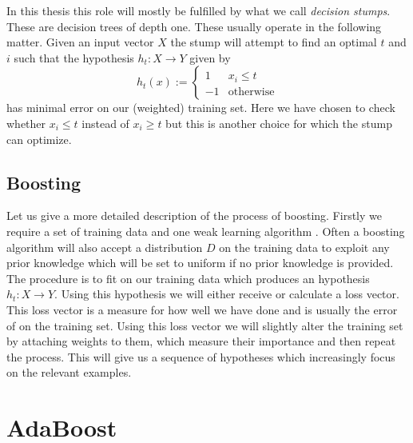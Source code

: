 \par In this thesis this role will mostly be fulfilled by what we call \textit{decision stumps}. These are decision trees of depth one. These usually operate in the following matter. Given an input vector $X$ the stump will attempt to find an optimal $t$ and $i$ such that the hypothesis $h_t:X\to Y$ given by $$h_t(x):=\begin{cases}1 &x_i\leq t \\ -1 &\text{otherwise}\end{cases}$$ has minimal error on our (weighted) training set. Here we have chosen to check whether $x_i\leq t$ instead of $x_i\geq t$ but this is another choice for which the stump can optimize. 

\subsection{Boosting}
\label{subsec:boost}

Let us give a more detailed description of the process of boosting. Firstly we require a set of training data and one weak learning algorithm \weak. Often a boosting algorithm will also accept a distribution $D$ on the training data to exploit any prior knowledge which will be set to uniform if no prior knowledge is provided. The procedure is to fit \weak on our training data which produces an hypothesis $h_t:X\to Y$. Using this hypothesis we will either receive or calculate a loss vector. This loss vector is a measure for how well we have done and is usually the error of \weak on the training set. Using this loss vector we will slightly alter the training set by attaching weights to them, which measure their importance and then repeat the process. This will give us a sequence of hypotheses which increasingly focus on the relevant examples. 

\section{AdaBoost}
\label{sec:ada}
